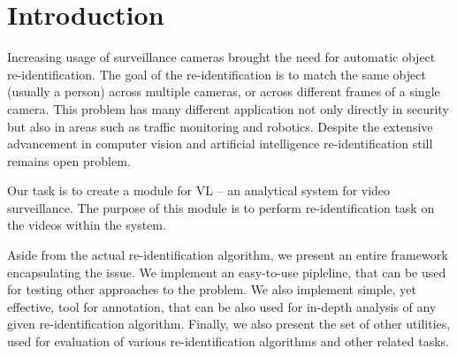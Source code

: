 \chapter*{Introduction}

Increasing usage of surveillance cameras brought the need for automatic object
re-identification.  The goal of the re-identification is to match the same
object (usually a person) across multiple cameras, or across different frames
of a single camera. This problem has many different application not only
directly in security but also in areas such as traffic monitoring and robotics.
Despite the extensive advancement in computer vision and artificial
intelligence re-identification still remains open problem.

Our task is to create a module for \gls{VL} -- an analytical system
for video surveillance. The purpose of this module is to perform
re-identification task on the videos within the system.

Aside from the actual re-identification algorithm, we present an entire
framework encapsulating the issue. We implement an easy-to-use pipleline, that
can be used for testing other approaches to the problem. We also implement
simple, yet effective, tool for annotation, that can be also used for
in-depth analysis of any given re-identification algorithm. Finally, we also
present the set of other utilities, used for evaluation of various
re-identification algorithms and other related tasks.